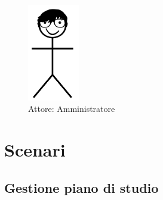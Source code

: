 \begin{figure}[h]
	\centering
	\includegraphics[width=0.2\textwidth]{imgs/attori/admin.png}
	\caption{Attore: Amministratore}
	\label{fig:Attore: Amministratore} 
\end{figure}



\newpage

\section{Scenari}
\subsection{Gestione piano di studio}
